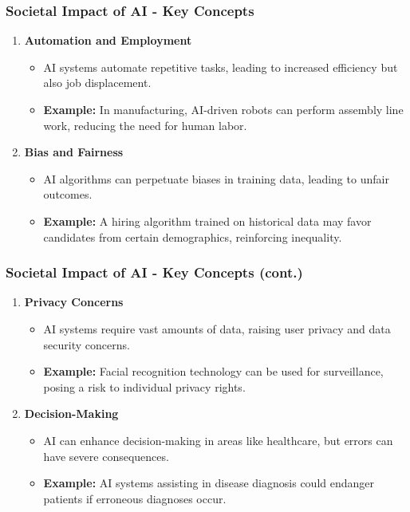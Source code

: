 \documentclass{beamer}
\begin{document}
\begin{frame}[fragile]
    \frametitle{Societal Impact of AI - Key Concepts}
    
    \begin{enumerate}
        \item \textbf{Automation and Employment}
            \begin{itemize}
                \item AI systems automate repetitive tasks, leading to increased efficiency but also job displacement.
                \item \textbf{Example:} In manufacturing, AI-driven robots can perform assembly line work, reducing the need for human labor.
            \end{itemize}
        
        \item \textbf{Bias and Fairness}
            \begin{itemize}
                \item AI algorithms can perpetuate biases in training data, leading to unfair outcomes.
                \item \textbf{Example:} A hiring algorithm trained on historical data may favor candidates from certain demographics, reinforcing inequality.
            \end{itemize}
    \end{enumerate}
\end{frame}

\begin{frame}[fragile]
    \frametitle{Societal Impact of AI - Key Concepts (cont.)}

    \begin{enumerate}[resume]
        \item \textbf{Privacy Concerns}
            \begin{itemize}
                \item AI systems require vast amounts of data, raising user privacy and data security concerns.
                \item \textbf{Example:} Facial recognition technology can be used for surveillance, posing a risk to individual privacy rights.
            \end{itemize}

        \item \textbf{Decision-Making}
            \begin{itemize}
                \item AI can enhance decision-making in areas like healthcare, but errors can have severe consequences.
                \item \textbf{Example:} AI systems assisting in disease diagnosis could endanger patients if erroneous diagnoses occur.
            \end{itemize}
    \end{enumerate}
\end{frame}
\end{document}
